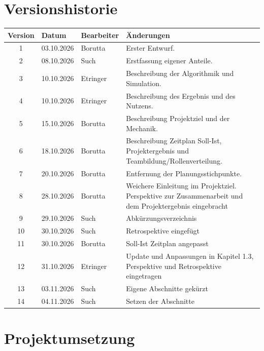 \documentclass[
  a4paper,
  12pt,
  DIV=12,        %
  parskip=half,  %
  headings=small %
]{scrartcl}
\theoremstyle{definition}
\theoremstyle{definition}
\begin{document}


\section*{Versionshistorie}
\begin{tabularx}{\textwidth}{@{}clp{2.6cm}X@{}}
\toprule
\textbf{Version} & \textbf{Datum} & \textbf{Bearbeiter} & \textbf{Änderungen}\\
\midrule
1 & 03.10.2026 & Borutta & Erster Entwurf.\\
2 & 08.10.2026 & Such & Erstfassung eigener Anteile.\\
3 & 10.10.2026 & Etringer & Beschreibung der Algorithmik und Simulation.\\
4 & 10.10.2026 & Etringer & Beschreibung des Ergebnis und des Nutzens.\\
5 & 15.10.2026 & Borutta & Beschreibung Projektziel und der Mechanik.\\
6 & 18.10.2026 & Borutta & Beschreibung Zeitplan Soll-Ist, Projektergebnis und Teambildung/Rollenverteilung.\\
7 & 20.10.2026 & Borutta & Entfernung der Planungsstichpunkte.\\
8 & 28.10.2026 & Borutta & Weichere Einleitung im Projektziel. Perspektive zur Zusammenarbeit und dem Projektergebnis eingebracht\\
9 & 29.10.2026 & Such & Abkürzungsverzeichnis \\
10 & 30.10.2026 & Such & Retrospektive eingefügt \\
11 & 30.10.2026 & Borutta & Soll-Ist Zeitplan angepasst \\
12 & 31.10.2026 & Etringer & Update und Anpassungen in Kapitel 1.3, Perspektive und Retrospektive eingetragen\\
13 & 03.11.2026 & Such & Eigene Abschnitte gekürzt\\
14 & 04.11.2026 & Such & Setzen der Abschnitte \\
\bottomrule
\end{tabularx}

\newpage

\tableofcontents

\newpage
\printnoidxglossary[type=\acronymtype,title={Abkürzungsverzeichnis},style={long}]

\newpage

\section{Projektumsetzung}\label{projektumsetzung}
\end{document}
